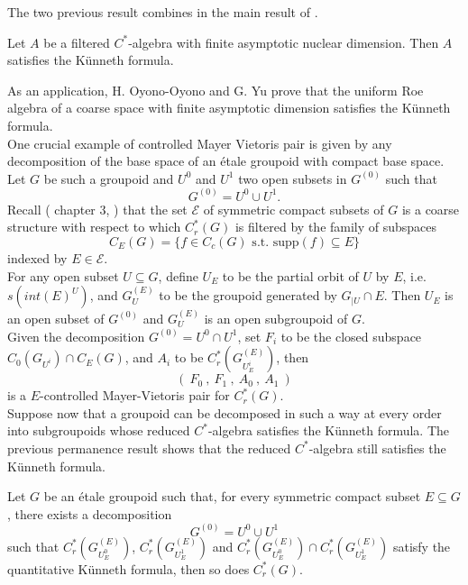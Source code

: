 The two previous result combines in the main result of \cite{OY4}.
\begin{thm}
Let $A$ be a filtered $C^*$-algebra with finite asymptotic nuclear dimension. Then $A$ satisfies the Künneth formula. \end{thm}

As an application, H. Oyono-Oyono and G. Yu prove that the uniform Roe algebra of a coarse space with finite asymptotic dimension satisfies the Künneth formula.\\

One crucial example of controlled Mayer Vietoris pair is given by any decomposition of the base space of an \'etale groupoid with compact base space. Let $G$ be such a groupoid and $U^0$ and $U^1$ two open subsets in $G^{(0)}$ such that
\[G^{(0)} = U^0 \cup U^1. \]
Recall (\cite{DellAieraThesis} chapter $3$, \cite{dell2017controlled}) that the set $\mathcal E$ of symmetric compact subsets of $G$ is a coarse structure with respect to which $C_r^*(G)$ is filtered by the family of subspaces 
\[C_E(G) = \{ f\in C_c(G) \text{ s.t. supp}(f)\subseteq E  \}\]
indexed by $E\in \mathcal E$.\\

For any open subset $U\subseteq G$, define $U_E$ to be the partial orbit of $U$ by $E$, i.e. $s(int(E)^U)$, and $G^{(E)}_U$ to be the groupoid generated by $G_{|U}\cap E$. Then $U_E$ is an open subset of $G^{(0)}$ and $G^{(E)}_U$ is an open subgroupoid of $G$.\\
 
Given the decomposition $G^{(0)}= U^0 \cap U^1$, set $F_i$ to be the closed subspace $C_0(G_{U^i})\cap C_E(G)$, and $A_i$ to be $C_r^*(G_{U^i_E}^{(E)})$, then 
\[\left( \ F_0 \ , \ F_1 \ , \ A_0 \ , \ A_1 \  \right)\]
is a $E$-controlled Mayer-Vietoris pair for $C_r^*(G)$. \\

Suppose now that a groupoid can be decomposed in such a way at every order into subgroupoids whose reduced $C^*$-algebra satisfies the Künneth formula. The previous permanence result shows that the reduced $C^*$-algebra still satisfies the Künneth formula. 

\begin{prop} \label{stability} Let $G$ be an \'etale groupoid such that, for every symmetric compact subset $E\subseteq G$, there exists a decomposition 
\[G^{(0)} = U^0 \cup U^1\]
such that $C^*_r(G_{U^0_E}^{(E)})$, $C^*_r(G_{U^1_E}^{(E)})$  and $C^*_r(G_{U^0_E}^{(E)}) \cap C^*_r(G_{U^1_E}^{(E)})$ satisfy the quantitative Künneth formula, then so does $C^*_r(G)$.
\end{prop}

